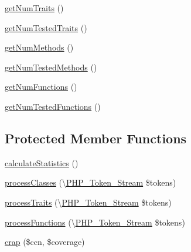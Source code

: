 \begin{DoxyCompactItemize}
\item 
\mbox{\hyperlink{class_sebastian_bergmann_1_1_code_coverage_1_1_node_1_1_file_a8b1689472c8328bd77d2133c0d8f3c19}{get\+Num\+Traits}} ()
\item 
\mbox{\hyperlink{class_sebastian_bergmann_1_1_code_coverage_1_1_node_1_1_file_a9f4b03b1f2e8b5d93df2619def56c03f}{get\+Num\+Tested\+Traits}} ()
\item 
\mbox{\hyperlink{class_sebastian_bergmann_1_1_code_coverage_1_1_node_1_1_file_a33d2a6d8c0d0dac6266c308b69500df8}{get\+Num\+Methods}} ()
\item 
\mbox{\hyperlink{class_sebastian_bergmann_1_1_code_coverage_1_1_node_1_1_file_a48f8ec1c354ab177280088a1ddf90439}{get\+Num\+Tested\+Methods}} ()
\item 
\mbox{\hyperlink{class_sebastian_bergmann_1_1_code_coverage_1_1_node_1_1_file_aa38acc99dd8fc7d59b28b396c2d9d07a}{get\+Num\+Functions}} ()
\item 
\mbox{\hyperlink{class_sebastian_bergmann_1_1_code_coverage_1_1_node_1_1_file_a6697408b128d1bb88427a2789d7bc6e8}{get\+Num\+Tested\+Functions}} ()
\end{DoxyCompactItemize}
\subsection*{Protected Member Functions}
\begin{DoxyCompactItemize}
\item 
\mbox{\hyperlink{class_sebastian_bergmann_1_1_code_coverage_1_1_node_1_1_file_a1a22fcbdbc0a8d3a0d240cad258acb18}{calculate\+Statistics}} ()
\item 
\mbox{\hyperlink{class_sebastian_bergmann_1_1_code_coverage_1_1_node_1_1_file_a9518cc97523a51e821c2de082a63cbb9}{process\+Classes}} (\textbackslash{}\mbox{\hyperlink{class_p_h_p___token___stream}{P\+H\+P\+\_\+\+Token\+\_\+\+Stream}} \$tokens)
\item 
\mbox{\hyperlink{class_sebastian_bergmann_1_1_code_coverage_1_1_node_1_1_file_a2ae5ffccc758533bc01b13ad8ccc039f}{process\+Traits}} (\textbackslash{}\mbox{\hyperlink{class_p_h_p___token___stream}{P\+H\+P\+\_\+\+Token\+\_\+\+Stream}} \$tokens)
\item 
\mbox{\hyperlink{class_sebastian_bergmann_1_1_code_coverage_1_1_node_1_1_file_ac082ae1db286a5c247cef4dc04172e15}{process\+Functions}} (\textbackslash{}\mbox{\hyperlink{class_p_h_p___token___stream}{P\+H\+P\+\_\+\+Token\+\_\+\+Stream}} \$tokens)
\item 
\mbox{\hyperlink{class_sebastian_bergmann_1_1_code_coverage_1_1_node_1_1_file_a5e1b24743b85c3f4930a8100bae4589d}{crap}} (\$ccn, \$coverage)
\end{DoxyCompactItemize}


